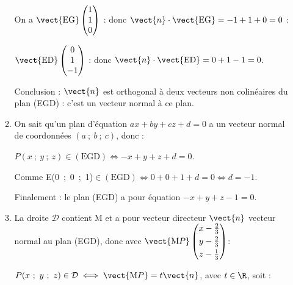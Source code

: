 \begin{enumerate}
\begin{enumerate}
On a $\vect{\text{EG}}\begin{pmatrix}1\\1\\0\end{pmatrix}$ : donc $\vect{n} \cdot \vect{\text{EG}} = - 1 +1 + 0 = 0$ :

$\vect{\text{ED}}\begin{pmatrix}0\\1\\-1\end{pmatrix}$ : donc $\vect{n} \cdot \vect{\text{ED}} =  0 + 1 - 1  = 0$.

Conclusion : $\vect{n}$ est orthogonal à deux vecteurs non colinéaires du plan (EGD) : c'est un vecteur normal à ce plan.
		\item %
		On sait qu'un plan d'équation $ax + by + cz + d = 0$ a un vecteur normal de coordonnées $(a~;~b~;~c)$, donc :
		
$P(x~;~y~;~z) \in (\text{EGD})  \iff -x + y + z + d = 0$.

Comme E(0~;~0~;~1)$\in (\text{EGD}) \iff 0 + 0 + 1 + d = 0 \iff d = - 1$.

Finalement : le plan (EGD) a pour équation $-x + y + z - 1 = 0$.
		\item %
		

La droite $\mathcal{D}$ contient M et a pour vecteur directeur $\vect{n}$ vecteur normal au plan (EGD), donc avec $\vect{\text{M}P}\begin{pmatrix}x - \frac{2}{3}\\[3pt]y - \frac{2}{3}\\[3pt]z - \frac{1}{3}\end{pmatrix}$:

$P(x~;~y~;~z) \in \mathcal{D} \iff \vect{\text{M}P} = t \vect{n}$, avec $t \in \R$, soit :


\end{enumerate}
\end{enumerate}
